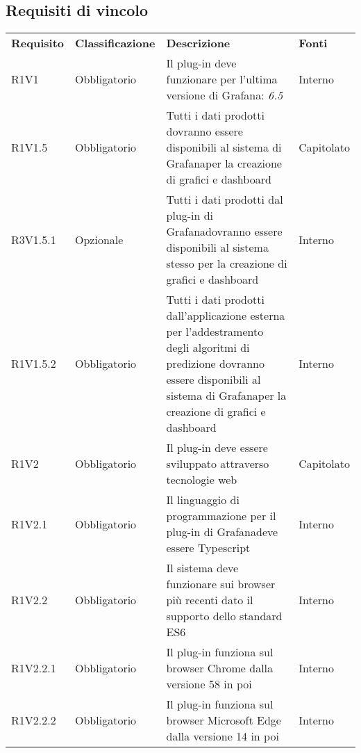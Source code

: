 \subsection{Requisiti di vincolo}
	\begin{longtable} {
		>{\centering}p{18mm} 
		>{\centering}p{28mm}
		>{}p{50mm} 
		>{}p{28mm}
		}
	\rowcolor{gray!50}
	\textbf{Requisito} & 
	\textbf{Classificazione} & 
	\textbf{Descrizione} & 
	\textbf{Fonti} 	\TBstrut \\
	
	R1V1 & 
	Obbligatorio & 
	Il plug-in deve funzionare per l'ultima versione di Grafana\glo: \textit{6.5} &
	Interno  \TBstrut \\ [2mm]		
	
	R1V1.5 &
	Obbligatorio &
	Tutti i dati prodotti dovranno essere disponibili al sistema di Grafana\glosp per la creazione di grafici e dashboard\glo &
	Capitolato  \TBstrut \\ [2mm]
	
	R3V1.5.1 &
	Opzionale &
	Tutti i dati prodotti dal plug-in di Grafana\glosp dovranno essere disponibili al sistema stesso per la creazione di grafici e dashboard\glo &
	Interno  \TBstrut \\ [2mm]
	
	R1V1.5.2 &
	Obbligatorio &
	Tutti i dati prodotti dall'applicazione esterna per l'addestramento degli algoritmi di predizione dovranno essere disponibili al sistema di Grafana\glosp per la creazione di grafici e dashboard\glo &
	Interno  \TBstrut \\ [2mm]

	R1V2 & 
	Obbligatorio & 
	Il plug-in deve essere sviluppato attraverso tecnologie web &
	Capitolato  \TBstrut \\ [2mm]
	
	R1V2.1 & 
	Obbligatorio & 
	Il linguaggio di programmazione per il plug-in di Grafana\glosp deve essere Typescript &
	Interno  \TBstrut \\ [2mm]
	
	R1V2.2 & 
	Obbligatorio & 
	Il sistema deve funzionare sui browser più recenti dato il supporto dello standard ES6 &
	Interno  \TBstrut \\ [2mm]
	
	R1V2.2.1 & 
	Obbligatorio & 
	Il plug-in funziona sul browser Chrome dalla versione 58 in poi &
	Interno  \TBstrut \\ [2mm]
	
	R1V2.2.2 & 
	Obbligatorio & 
	Il plug-in funziona sul browser Microsoft Edge dalla versione 14 in poi &
	Interno  \TBstrut \\ [2mm]
	

\end{longtable}
